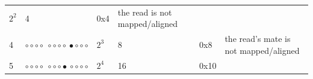 \documentclass[]{krantz}
\begin{document}
\begin{longtable}[]{@{}llllll@{}}
\begin{minipage}[t]{0.12\columnwidth}
\(2^2\)\strut
\end{minipage} & \begin{minipage}[t]{0.07\columnwidth}\raggedright
4\strut
\end{minipage} & \begin{minipage}[t]{0.09\columnwidth}\raggedright
0x4\strut
\end{minipage} & \begin{minipage}[t]{0.35\columnwidth}\raggedright
the read is not mapped/aligned\strut
\end{minipage}\tabularnewline
\begin{minipage}[t]{0.09\columnwidth}\raggedright
4\strut
\end{minipage} & \begin{minipage}[t]{0.12\columnwidth}\raggedright
\({\circ}{\circ}{\circ}{\circ}~{\circ}{\circ}{\circ}{\circ}~{\bullet}{\circ}{\circ}{\circ}\)\strut
\end{minipage} & \begin{minipage}[t]{0.12\columnwidth}\raggedright
\(2^3\)\strut
\end{minipage} & \begin{minipage}[t]{0.07\columnwidth}\raggedright
8\strut
\end{minipage} & \begin{minipage}[t]{0.09\columnwidth}\raggedright
0x8\strut
\end{minipage} & \begin{minipage}[t]{0.35\columnwidth}\raggedright
the read's mate is not
mapped/aligned\strut
\end{minipage}\tabularnewline
\begin{minipage}[t]{0.09\columnwidth}\raggedright
5\strut
\end{minipage} & \begin{minipage}[t]{0.12\columnwidth}\raggedright
\({\circ}{\circ}{\circ}{\circ}~{\circ}{\circ}{\circ}{\bullet}~{\circ}{\circ}{\circ}{\circ}\)\strut
\end{minipage} & \begin{minipage}[t]{0.12\columnwidth}\raggedright
\(2^4\)\strut
\end{minipage} & \begin{minipage}[t]{0.07\columnwidth}\raggedright
16\strut
\end{minipage} & \begin{minipage}[t]{0.09\columnwidth}\raggedright
0x10\strut
\end{minipage} & \begin{minipage}[t]{0.35\columnwidth}\raggedright

\end{minipage}
\end{longtable}
\end{document}

